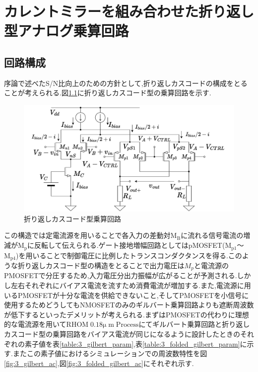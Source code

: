 \chapter{カレントミラーを組み合わせた折り返し型アナログ乗算回路}

    \section{回路構成}
        序論で述べたS/N比向上のための方針として,折り返しカスコードの構成をとることが考えられる.図\ref{fig:3_folded_gilbert}に折り返しカスコード型の乗算回路を示す.
        \begin{figure}[!b]
            \begin{center}
                \includegraphics[width=0.99\linewidth]{figures/chapter3/folded_gilbert.pdf}
                \caption{折り返しカスコード型乗算回路}
                \label{fig:3_folded_gilbert}
            \end{center}
        \end{figure}
        この構造では定電流源を用いることで各入力の差動対$\mathrm{M_{B}}$に流れる信号電流の増減が$\mathrm{M_{p}}$に反転して伝えられる.ゲート接地増幅回路としてはpMOSFET($\mathrm{M_{p1}}$～$\mathrm{M_{p4}}$)を用いることで制御電圧に比例したトランスコンダクタンスを得る.このような折り返しカスコード型の構造をとることで出力電圧は$M_{p}$と電流源のPMOSFETで分圧するため,入力電圧分出力振幅が広がることが予測される.しかし左右それぞれにバイアス電流を流すため消費電流が増加する.また,電流源に用いるPMOSFETが十分な電流を供給できないこと,そしてPMOSFETを小信号に使用するためどうしてもNMOSFETのみのギルバート乗算回路よりも遮断周波数が低下するといったデメリットが考えられる.まずはPMOSFETの代わりに理想的な電流源を用いて$\mathrm{RHOM\;0.18\mu\;m\;Process}$にてギルバート乗算回路と折り返しカスコード型の乗算回路をバイアス電流が同じになるように設計したときのそれぞれの素子値を表\ref{table:3_gilbert_param},表\ref{table:3_folded_gilbert_param}に示す.またこの素子値におけるシミュレーションでの周波数特性を図\ref{fig:3_gilbert_ac},図\ref{fig:3_folded_gilbert_ac}にそれぞれ示す.
